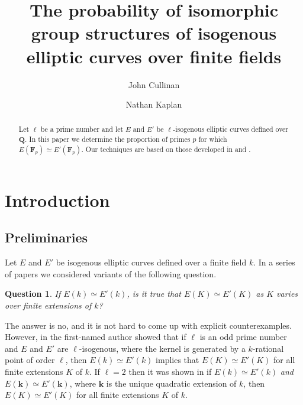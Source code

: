 \documentclass{amsart}
\newcommand{\F}{\mathbf{F}}
\newcommand{\Q}{\mathbf{Q}}
\numberwithin{equation}{section}
\theoremstyle{plain}
\newtheorem{qu}{Question}
\theoremstyle{remark}
\begin{document}
\title[Isomorphic Group Structures]{The probability of isomorphic group structures of isogenous elliptic curves over finite fields}

\author{John Cullinan}
\address{Department of Mathematics, Bard College, Annandale-On-Hudson, NY 12504, USA}

\author{Nathan Kaplan}
\address{Department of Mathematics, University of California, Irvine, CA 92697, USA}

\begin{abstract}
Let $\ell$ be a prime number and let $E$ and $E'$ be $\ell$-isogenous elliptic curves defined over $\Q$.  In this paper we determine the proportion of primes $p$ for which $E(\F_p) \simeq E'(\F_p)$.  Our techniques are based on those developed in \cite{ck} and \cite{rnt}.
\end{abstract}

\maketitle

\section{Introduction} \label{intro}

\subsection{Preliminaries} Let $E$ and $E'$ be isogenous elliptic curves defined over a finite field $k$.  In a series of papers \cite{cullinan1, cullinan2, ck, rnt} we considered variants of the following question.

\begin{qu}
If $E(k) \simeq E'(k)$, is it true that $E(K) \simeq E'(K)$ as $K$ varies over finite extensions of $k$? 
\end{qu}

The answer is no, and it is not hard to come up with explicit counterexamples.  However, in  \cite{cullinan1} the first-named author showed that if $\ell$ is an odd prime number and $E$ and $E'$ are $\ell$-isogenous, where the kernel is generated by a $k$-rational point of order $\ell$, then $E(k) \simeq E'(k)$ implies that $E(K) \simeq E'(K)$ for all finite extensions $K$ of $k$.   If $\ell=2$ then it was shown in \cite{cullinan2} if $E(k) \simeq E'(k)$ \emph{and} $E(\mathbf{k}) \simeq E'(\mathbf{k})$, where $\mathbf{k}$ is the unique quadratic extension of $k$, then $E(K) \simeq E'(K)$ for all finite extensions $K$ of $k$.
\end{document}
